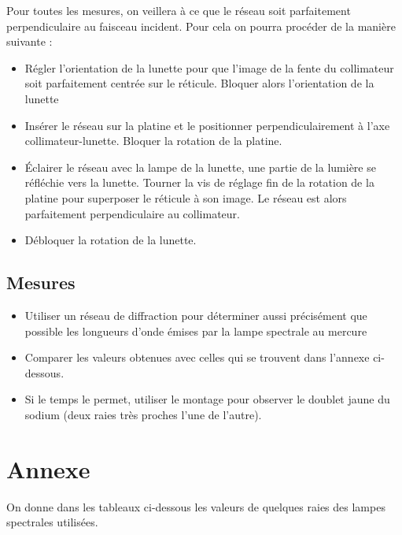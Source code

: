 \documentclass{tp}
\begin{document}
Pour toutes les mesures, on veillera à ce que le réseau soit parfaitement perpendiculaire au faisceau incident. Pour cela on pourra procéder de la manière suivante :
\begin{itemize}
  \item Régler l'orientation de la lunette pour que l'image de la fente du collimateur soit parfaitement centrée sur le réticule. Bloquer alors l'orientation de la lunette
  \item Insérer le réseau sur la platine et le positionner perpendiculairement à l'axe collimateur-lunette. Bloquer la rotation de la platine.
  \item Éclairer le réseau avec la lampe de la lunette, une partie de la lumière se réfléchie vers la lunette. Tourner la vis de réglage fin de la rotation de la platine pour superposer le réticule à son image. Le réseau est alors parfaitement perpendiculaire au collimateur.
  \item Débloquer la rotation de la lunette.
\end{itemize}

\subsection{Mesures}
\begin{itemize}[resume=TP]
\item Utiliser un réseau de diffraction pour déterminer aussi précisément que possible les longueurs d'onde émises par la lampe spectrale au mercure

\item Comparer les valeurs obtenues avec celles qui se trouvent dans l'annexe ci-dessous.

\item Si le temps le permet, utiliser le montage pour observer le doublet jaune du sodium (deux raies très proches l'une de l'autre).
\end{itemize}

 \section{Annexe}%
 \label{sec:annexe}

 On donne dans les tableaux ci-dessous les valeurs de quelques raies des lampes spectrales utilisées. 

\vspace{1em}
\end{document}
